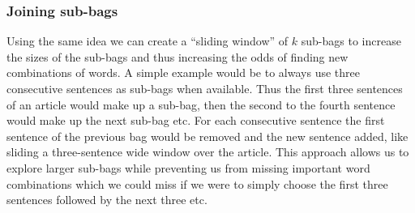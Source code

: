 \subsubsection{Joining sub-bags}
Using the same idea we can create a ``sliding window'' of $k$ sub-bags to increase the sizes of the sub-bags and thus increasing the odds of finding new combinations of words. A simple example would be to always use three consecutive sentences as sub-bags when available. Thus the first three sentences of an article would make up a sub-bag, then the second to the fourth sentence would make up the next sub-bag etc. For each consecutive sentence the first sentence of the previous bag would be removed and the new sentence added, like sliding a three-sentence wide window over the article. This approach allows us to explore larger sub-bags while preventing us from missing important word combinations which we could miss if we were to simply choose the first three sentences followed by the next three etc.
